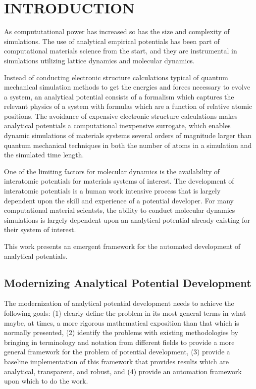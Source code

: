 \chapter{INTRODUCTION}\label{intro}

As compututational power has increased so has the size and complexity of simulations.  The use of analytical empirical potentials has been part of computational materials science from the start, and they are instrumental in simulations utilizing lattice dynamics and molecular dynamics.

Instead of conducting electronic structure calculations typical of quantum mechanical simulation methods to get the energies and forces necessary to evolve a system, an analytical potential consists of a formalism which captures the relevant physics of a system with formulas which are a function of relative atomic positions.  The avoidance of expensive electronic structure calculations makes analytical potentials a computational inexpensive surrogate, which enables dynamic simulations of materials systems several orders of magnitude larger than quantum mechanical techniques in both the number of atoms in a simulation and the simulated time length.

One of the limiting factors for molecular dynamics is the availability of interatomic potentials for materials systems of interest.  The development of interatomic potentials is a human work intensive process that is largely dependent upon the skill and experience of a potential developer.  For many computational material scientsts, the ability to conduct molecular dynamics simulations is largely dependent upon an analytical potential already existing for their system of interest.

This work presents an emergent framework for the automated development of analytical potentials.

\section{Modernizing Analytical Potential Development}

The modernization of analytical potential development needs to achieve the following goals:
(1) clearly define the problem in its most general terms in what maybe, at times, a more rigorous mathematical exposition than that which is normally presented,
(2) identify the problems with existing methodologies by bringing in terminology and notation from different fields to provide a more general framework for the problem of potential development,
(3) provide a baseline implementation of this framework that provides results which are analytical, transparent, and robust, and
(4) provide an automation framework upon which to do the work.

